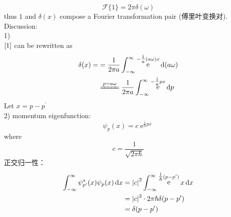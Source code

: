 \documentclass[UTF8]{ctexart} %
\DeclareMathOperator{\p}{\prime}
\DeclareMathOperator{\intdinf}{\int_{-\infty}^\infty}
\DeclareMathOperator{\e}{\mathrm{e}}
\renewcommand{\I}{\mathrm{i}}
\numberwithin{equation}{section}
\begin{document}
\begin{equation}\label{key}
\mathcal{F}\{1\}=2\pi\delta(\omega)
\end{equation}
thus $1$ and $\delta(x)$ compose a Fourier transformation pair (傅里叶变换对).\\
Discussion:\\
1) \\
$\eqref{1}$ can be rewritten as
\begin{equation}\label{key}
\begin{aligned}
\delta(x)=&=\dfrac{1}{2\pi a}\intdinf\e^{-\tfrac{\I}{a}(a\omega) x}\dd(a\omega)\\
&\xlongequal{p=a\omega} \dfrac{1}{2\pi a}\intdinf\e^{-\tfrac{\I}{a}px}\dd{p}
\end{aligned}
\end{equation}
Let $x=p-p^{\p}$
\begin{equation}\label{key}
\end{equation}
2) momentum eigenfunction:
\begin{equation}\label{key}
\psi_p(x)=c\e^{\tfrac{\I}{\hbar}px}
\end{equation}
where
\begin{equation}\label{key}
c=\dfrac{1}{\sqrt{2\pi\hbar}}
\end{equation}
正交归一性：
\begin{equation}\label{key}
\begin{aligned}
\intdinf\psi_{p^{\p}}^{*} (x)\psi_p(x)\dd{x}
&=\abs{c}^2\intdinf\e^{\tfrac{\I}{\hbar}(p-p^{\p})}x\dd{x}\\
&=\abs{c}^2\cdot 2\pi\hbar\delta(p-p^{\p})\\
&=\delta(p-p^{\p})
\end{aligned}
\end{equation}
\end{document}
